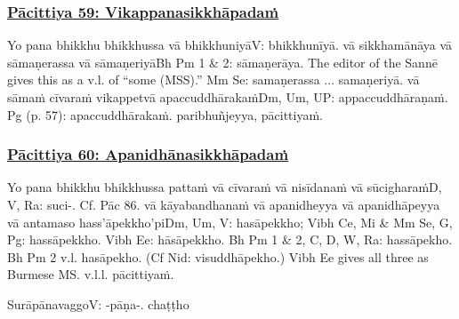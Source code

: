 \subsubsection*{\hyperref[exp59]{Pācittiya 59: Vikappanasikkhāpadaṁ}}
\label{pac59}

Yo pana bhikkhu bhikkhussa vā bhikkhuniyā\makeatletter\hyperlink{endnote-appendix}\makeatother V: bhikkhunīyā. vā sikkhamānāya vā sāmaṇerassa vā sāmaṇeriyā\makeatletter\hyperlink{endnote-appendix}\makeatother Bh Pm 1 & 2: sāmaṇerāya. The editor of the Sannē gives this as a v.l. of “some (MSS).” Mm Se: samaṇerassa ... samaṇeriyā. vā sāmaṁ cīvaraṁ vikappetvā apaccuddhārakaṁ\makeatletter\hyperlink{endnote-appendix}\makeatother Dm, Um, UP: appaccuddhāraṇaṁ. Pg (p. 57): apaccuddhārakaṁ. paribhuñjeyya, pācittiyaṁ.



\subsubsection*{\hyperref[exp60]{Pācittiya 60: Apanidhānasikkhāpadaṁ}}
\label{pac60}

Yo pana bhikkhu bhikkhussa pattaṁ vā cīvaraṁ vā nisīdanaṁ vā sūcigharaṁ\makeatletter\hyperlink{endnote-appendix}\makeatother D, V, Ra: suci-. Cf. Pāc 86. vā kāyabandhanaṁ vā apanidheyya vā apanidhāpeyya vā antamaso hass'āpekkho'pi\makeatletter\hyperlink{endnote-appendix}\makeatother Dm, Um, V:  hasāpekkho; Vibh Ce, Mi & Mm Se, G, Pg:  hassāpekkho. Vibh Ee:  hāsāpekkho. Bh Pm 1 & 2, C, D, W, Ra:  hassāpekho. Bh Pm 2 v.l. hasāpekho. (Cf Nid: visuddhāpekho.) Vibh Ee gives all three as Burmese MS. v.l.l. pācittiyaṁ.

\begin{center}
	Surāpānavaggo\makeatletter\hyperlink{endnote-appendix}\makeatother V: -pāṇa-. chaṭṭho
\end{center}



